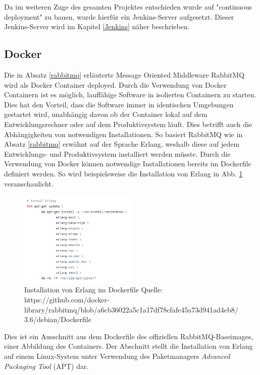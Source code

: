 Da im weiteren Zuge des gesamten Projektes entschieden wurde auf "continuous deployment" zu bauen, wurde hierfür ein Jenkins-Server aufgesetzt. Dieser Jenkins-Server wird im Kapitel \ref{Jenkins} näher beschrieben. 

\subsection{Docker}\label{Docker}
Die in Absatz \ref{rabbitmq} erläuterte Message Oriented Middleware RabbitMQ wird als Docker Container deployed. Durch die Verwendung von Docker Containern ist es möglich, lauffähige Software in isolierten Containern zu starten. Dies hat den Vorteil, dass die Software immer in identischen Umgebungen gestartet wird, unabhängig davon ob der Container lokal auf dem Entwicklungsrechner oder auf dem Produktivsystem läuft. Dies betrifft auch die Abhängigkeiten von notwendigen Installationen. So basiert RabbitMQ wie in Absatz \ref{rabbitmq} erwähnt auf der Sprache Erlang, weshalb diese auf jedem Entwicklungs- und Produktivsystem installiert werden müsste. Durch die Verwendung von Docker können notwendige Installationen bereits im Dockerfile definiert werden. So wird beispielsweise die Installation von Erlang in Abb. \ref{img:erlangDockerfile} veranschaulicht. 

\begin{figure}[htbp]
	\centering
	\includegraphics[width=0.5\textwidth]{Bilder/erlangDockerfile.png}
	\caption{Installation von Erlang im Dockerfile Quelle: https://github.com/docker-library/rabbitmq/blob/a6cb36022a5c1a17df78cfafe45a73d941ad4eb8/3.6/\-debian/Dockerfile}
	\label{img:erlangDockerfile}
\end{figure}
Dies ist ein Ausschnitt aus dem Dockerfile des offiziellen RabbitMQ-Baseimages, einer Abbildung des Containers. Der Abschnitt stellt die Installation von Erlang auf einem Linux-System unter Verwendung des Paketmanagers \textit{Advanced Packaging Tool} (APT) dar.
